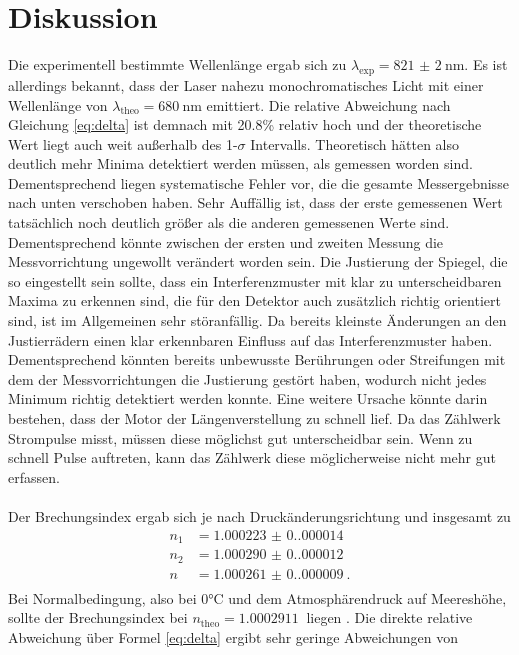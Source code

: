 \section{Diskussion}
Die experimentell bestimmte Wellenlänge ergab sich zu $\lambda_\text{exp}=\qty{821(2)}{\nm}$.
Es ist allerdings bekannt, dass der Laser nahezu monochromatisches Licht mit 
einer Wellenlänge von $\lambda_\text{theo}=\qty{680}{\nm}$ emittiert.
Die relative Abweichung nach Gleichung \eqref{eq:delta} ist demnach mit 20.8\% relativ hoch
und der theoretische Wert liegt auch weit außerhalb des 1-$\sigma$ Intervalls.
Theoretisch hätten also deutlich mehr Minima detektiert werden müssen, als gemessen worden sind.
Dementsprechend liegen systematische Fehler vor, die die gesamte Messergebnisse nach unten verschoben haben.
Sehr Auffällig ist, dass der erste gemessenen Wert tatsächlich noch deutlich größer als die anderen gemessenen Werte sind.
Dementsprechend könnte zwischen der ersten und zweiten Messung die Messvorrichtung ungewollt 
verändert worden sein. Die Justierung der Spiegel, die so eingestellt sein sollte, dass ein Interferenzmuster mit klar zu unterscheidbaren Maxima 
zu erkennen sind, die für den Detektor auch zusätzlich richtig orientiert sind, ist im Allgemeinen sehr störanfällig.
Da bereits kleinste Änderungen an den Justierrädern einen klar erkennbaren Einfluss auf das Interferenzmuster haben.
Dementsprechend könnten bereits unbewusste Berührungen oder Streifungen mit dem der Messvorrichtungen die Justierung 
gestört haben, wodurch nicht jedes Minimum richtig detektiert werden konnte.
Eine weitere Ursache könnte darin bestehen, dass der Motor der Längenverstellung zu schnell lief.
Da das Zählwerk Strompulse misst, müssen diese möglichst gut unterscheidbar sein. Wenn zu schnell Pulse
auftreten, kann das Zählwerk diese möglicherweise nicht mehr gut erfassen.\\
\\
\noindent Der Brechungsindex ergab sich je nach Druckänderungsrichtung und insgesamt zu 
\begin{align*}
    n_1&=\qty{1.000223(0.000014)}{}\\
    n_2&=\qty{1.000290(0.000012)}{}\\
    n&=\qty{1.000261(0.000009)}{}.\\
\end{align*}
Bei Normalbedingung, also bei 0°C und dem Atmosphärendruck auf Meereshöhe,
sollte der Brechungsindex bei $n_\text{theo}=\qty{1.0002911}{}$ liegen \cite{Brechungsindex}.
Die direkte relative Abweichung über Formel \eqref{eq:delta} ergibt sehr geringe Abweichungen von
